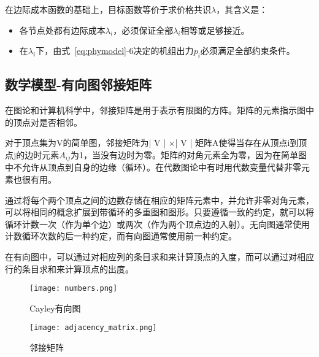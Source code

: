 在边际成本函数的基础上，目标函数等价于求价格共识$\lambda$，其含义是：

\begin{itemize}
    \item 各节点处都有边际成本$\lambda_{i}$，必须保证全部$\lambda_{i}$相等或足够接近。
    \item 在$\lambda_{i}$下，由式~\ref{eq:phymodel}-6决定的机组出力$p_{i}$必须满足全部约束条件。
\end{itemize}

\subsection{数学模型-有向图邻接矩阵}




在图论和计算机科学中，邻接矩阵是用于表示有限图的方阵。矩阵的元素指示图中的顶点对是否相邻。

对于顶点集为V的简单图，邻接矩阵为| V | ×| V | 矩阵A使得当存在从顶点i到顶点j的边时元素$A_{ij}$为1，当没有边时为零。矩阵的对角元素全为零，因为在简单图中不允许从顶点到自身的边缘（循环）。在代数图论中有时用代数变量代替非零元素也很有用。

通过将每个两个顶点之间的边数存储在相应的矩阵元素中，并允许非零对角元素，可以将相同的概念扩展到带循环的多重图和图形。只要遵循一致的约定，就可以将循环计数一次（作为单个边）或两次（作为两个顶点边的入射）。无向图通常使用计数循环次数的后一种约定，而有向图通常使用前一种约定。

在有向图中，可以通过对相应列的条目求和来计算顶点的入度，而可以通过对相应行的条目求和来计算顶点的出度。

\begin{figure}[htbp]
    \begin{minipage}{0.48\textwidth}
      \centering
      \texttt{[image: numbers.png]}
      \caption{Cayley有向图}
      \label{fig:Directed-Cayley-graph}
    \end{minipage}\hfill
    \begin{minipage}{0.48\textwidth}
      \centering
      \texttt{[image: adjacency\_matrix.png]}
      \caption{邻接矩阵}
      \label{fig:Adjacency-matrix}
    \end{minipage}
\end{figure}

